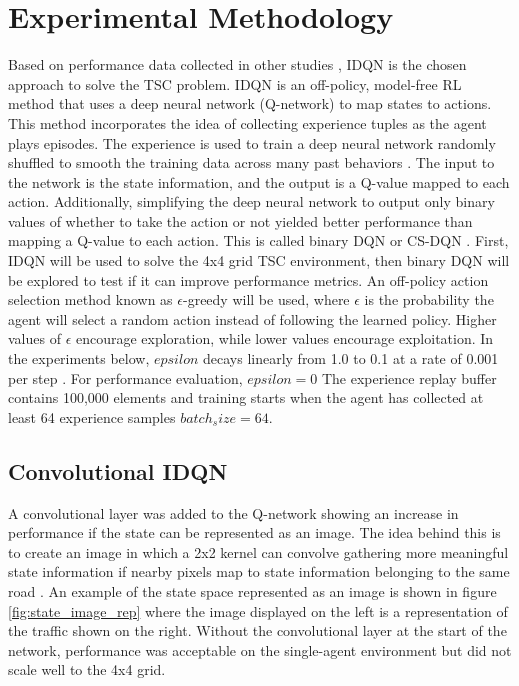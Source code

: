 \documentclass[letterpaper]{article} %
\begin{document}
\section{Experimental Methodology}
Based on performance data collected in other studies \cite{ault2021reinforcement} \cite{Ghanadbashi2023}, IDQN is the chosen approach to solve the TSC problem.
IDQN is an off-policy, model-free RL method that uses a deep neural network (Q-network) to map states to actions.
This method incorporates the idea of collecting experience tuples as the agent plays episodes.
The experience is used to train a deep neural network randomly shuffled to smooth the training data across many past behaviors \cite{DBLP:journals/corr/MnihKSGAWR13}.
The input to the network is the state information, and the output is a Q-value mapped to each action.
Additionally, simplifying the deep neural network to output only binary values of whether to take the action or not yielded better performance than mapping a Q-value to each action. This is called binary DQN or CS-DQN \cite{hafiz2020deep}.
First, IDQN will be used to solve the 4x4 grid TSC environment, then binary DQN will be explored to test if it can improve performance metrics.
An off-policy action selection method known as $\epsilon$-greedy will be used, where $\epsilon$ is the probability the agent will select a random action instead of following the learned policy.
Higher values of $\epsilon$ encourage exploration, while lower values encourage exploitation.
In the experiments below, $epsilon$ decays linearly from 1.0 to 0.1 at a rate of 0.001 per step \cite{Mnih2015}. For performance evaluation, $epsilon = 0$
The experience replay buffer contains 100,000 elements and training starts when the agent has collected at least 64 experience samples \(batch_size = 64\).

\subsection{Convolutional IDQN}
A convolutional layer was added to the Q-network showing an increase in performance if the state can be represented as an image.
The idea behind this is to create an image in which a 2x2 kernel can convolve gathering more meaningful state information if nearby pixels map to state information belonging to the same road \cite{ault2020learning}.
An example of the state space represented as an image is shown in figure \ref{fig:state_image_rep} where the image displayed on the left is a representation of the traffic shown on the right.
Without the convolutional layer at the start of the network, performance was acceptable on the single-agent environment but did not scale well to the 4x4 grid.
\end{document}
